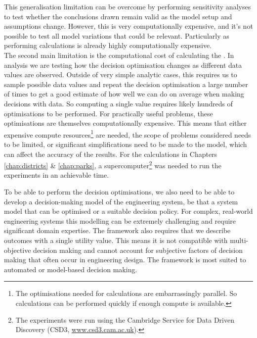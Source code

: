 This generalisation limitation can be overcome by performing sensitivity analyses to test whether the conclusions drawn remain valid as the model setup and assumptions change. However, this is very computationally expensive, and it's not possible to test all model variations that could be relevant. Particularly as performing  calculations is already highly computationally expensive.\\

The second main limitation is the computational cost of calculating the . In  analysis we are testing how the decision optimisation changes as different data values are observed. Outside of very simple analytic cases, this requires us to sample possible data values and repeat the decision optimisation a large number of times to get a good  estimate of how well we can do on average when making decisions with data. So computing a single  value requires likely hundreds of optimisations to be performed. For practically useful problems, these optimisations are themselves computationally expensive. This means that either expensive compute resources\footnote{The optimisations needed for  calculations are embarrassingly parallel. So calculations can be performed quickly if enough compute is available.} are needed, the scope of problems considered needs to be limited, or significant simplifications need to be made to the model, which can affect the accuracy of the results. For the  calculations in Chapters \ref{chap:districts} \& \ref{chap:parks}, a supercomputer\footnote{The experiments were run using the Cambridge Service for Data Driven Discovery (CSD3, \url{www.csd3.cam.ac.uk}).} was needed to run the experiments in an achievable time.

To be able to perform the decision optimisations, we also need to be able to develop a decision-making model of the engineering system, be that a system model that can be optimised or a suitable decision policy. For complex, real-world engineering systems this modelling can be extremely challenging and require significant domain expertise. The  framework also requires that we describe outcomes with a single utility value. This means it is not compatible with multi-objective decision making and cannot account for subjective factors of decision making that often occur in engineering design. The framework is most suited to automated or model-based decision making.\\

